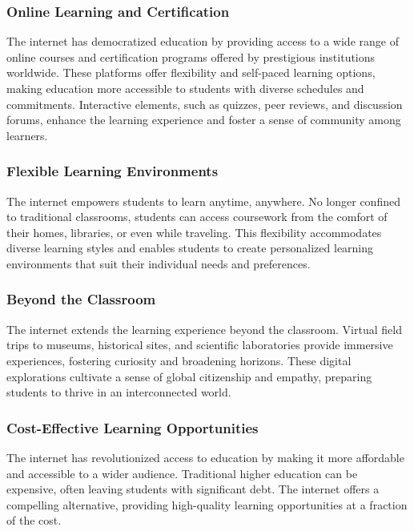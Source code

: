 \documentclass[a4paper,11pt]{article}
\begin{document}
\subsubsection {Online Learning and Certification}

The internet has democratized education by providing access to a wide range of online courses and certification programs offered by prestigious institutions worldwide. These platforms offer flexibility and self-paced learning options, making education more accessible to students with diverse schedules and commitments. Interactive elements, such as quizzes, peer reviews, and discussion forums, enhance the learning experience and foster a sense of community among learners.\cite{importance-reliable-internet-student}

\subsubsection{Flexible Learning Environments}

The internet empowers students to learn anytime, anywhere. No longer confined to traditional classrooms, students can access coursework from the comfort of their homes, libraries, or even while traveling. This flexibility accommodates diverse learning styles and enables students to create personalized learning environments that suit their individual needs and preferences.\cite{importance-reliable-internet-student}

\subsubsection{Beyond the Classroom}

The internet extends the learning experience beyond the classroom. Virtual field trips to museums, historical sites, and scientific laboratories provide immersive experiences, fostering curiosity and broadening horizons. These digital explorations cultivate a sense of global citizenship and empathy, preparing students to thrive in an interconnected world.

\subsubsection{Cost-Effective Learning Opportunities}

The internet has revolutionized access to education by making it more affordable and accessible to a wider audience. Traditional higher education can be expensive, often leaving students with significant debt. The internet offers a compelling alternative, providing high-quality learning opportunities at a fraction of the cost.
\end{document}
